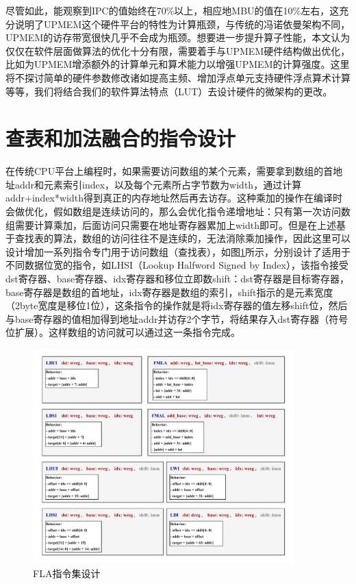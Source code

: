尽管如此，能观察到IPC的值始终在70\%以上，相应地MBU的值在10\%左右，这充分说明了UPMEM这个硬件平台的特性为计算瓶颈，与传统的冯诺依曼架构不同，UPMEM的访存带宽很快几乎不会成为瓶颈。想要进一步提升算子性能，本文认为仅仅在软件层面做算法的优化十分有限，需要着手与UPMEM硬件结构做出优化，比如为UPMEM增添额外的计算单元和算术能力以增强UPMEM的计算强度。这里将不探讨简单的硬件参数修改诸如提高主频、增加浮点单元支持硬件浮点算术计算等等，我们将结合我们的软件算法特点（LUT）去设计硬件的微架构的更改。

\section{查表和加法融合的指令设计}
在传统CPU平台上编程时，如果需要访问数组的某个元素，需要拿到数组的首地址addr和元素索引index，以及每个元素所占字节数为width，通过计算addr+index*width得到真正的内存地址然后再去访存。这种乘加的操作在编译时会做优化，假如数组是连续访问的，那么会优化指令递增地址：只有第一次访问数组需要计算乘加，后面访问只需要在地址寄存器累加上width即可。但是在上述基于查找表的算法，数组的访问往往不是连续的，无法消除乘加操作，因此这里可以设计增加一系列指令专门用于访问数组（查找表），如图\ref{LUTInst}所示，分别设计了适用于不同数据位宽的指令，如LHSI（Lookup Halfword Signed by Index），该指令接受dst寄存器、base寄存器、idx寄存器和移位立即数shift：dst寄存器是目标寄存器，base寄存器是数组的首地址，idx寄存器是数组的索引，shift指示的是元素宽度（2byte宽度是移位1位），这条指令的操作就是将idx寄存器的值左移shift位，然后与base寄存器的值相加得到地址addr并访存2个字节，将结果存入dst寄存器（符号位扩展）。这样数组的访问就可以通过这一条指令完成。

\begin{figure}[!htbp]
	\centering
    \includegraphics[width=0.9\textwidth]{figures/LUTInst.pdf}
	\caption{FLA指令集设计}
    \label{LUTInst}
\end{figure}

